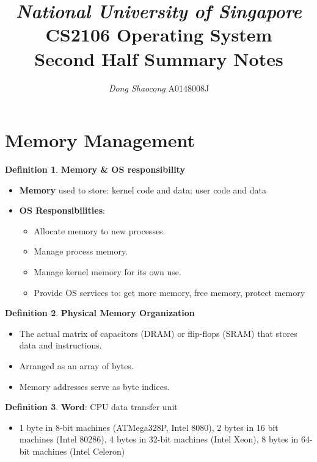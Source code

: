 \documentclass[11pt,a4paper]{article}
\title{\textsl{National University of Singapore} \\ \textbf{CS2106 Operating System}\\ Second Half Summary Notes}
\author{\textit{Dong Shaocong} A0148008J}
\theoremstyle{definition}
\newtheorem{definition}{Definition}[section]
\newenvironment{myitemize}
{ \begin{itemize}
    \setlength{\itemsep}{5pt}
    \setlength{\parskip}{0pt}
    \setlength{\parsep}{0pt}     }
{ \end{itemize}                  }
\begin{document}
\maketitle
\section{Memory Management}

\begin{definition}{\textbf{Memory \& OS responsibility}}
	\begin{myitemize}
		\item \textbf{Memory} used to store: kernel code and data; user code and data
		\item \textbf{OS Responsibilities}: 
		\begin{myitemize}
			\item Allocate memory to new processes.
			\item Manage process memory.
			\item Manage kernel memory for its own use.
			\item Provide OS services to: get more memory, free memory, protect memory
		\end{myitemize}
	\end{myitemize}
\end{definition}

\begin{definition}{\textbf{Physical Memory Organization}}
	\begin{myitemize}
		\item The actual matrix of capacitors (DRAM) or flip-flops (SRAM) that stores data and instructions.
		\item Arranged as an array of bytes.
		\item Memory addresses serve as byte indices.
	\end{myitemize}
\end{definition}

\begin{definition}{\textbf{Word}}: CPU data transfer unit
	\begin{myitemize}
		\item 1 byte in 8-bit machines (ATMega328P, Intel 8080), 2 bytes in 16 bit machines (Intel 80286),  4 bytes in 32-bit machines (Intel Xeon), 8 bytes in 64-bit machines (Intel Celeron)
	\end{myitemize}
\end{definition}
\end{document}
